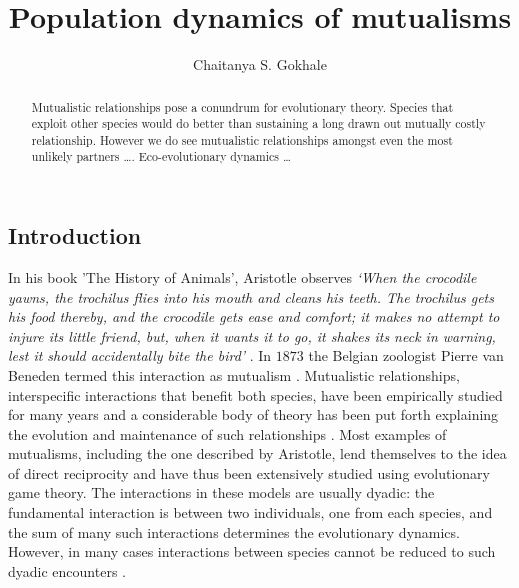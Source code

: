 \documentclass{pnastwo}
\begin{document}
\title{Population dynamics of mutualisms}

 \author{Chaitanya S. Gokhale}


\maketitle

\begin{article}

\begin{abstract}
Mutualistic relationships pose a conundrum for evolutionary theory.
Species that exploit other species would do better than sustaining a long drawn out mutually costly relationship. However we do see mutualistic relationships amongst even the most unlikely partners \ldots.
Eco-evolutionary dynamics \ldots
\end{abstract}



\section{Introduction}

In his book 'The History of Animals', Aristotle observes
{\em
`When the crocodile yawns, the trochilus flies into his mouth and cleans
his teeth. The trochilus gets his food thereby, and the crocodile
gets ease and comfort; it makes no attempt to injure its little friend,
but, when it wants it to go, it shakes its neck in warning, lest it
should accidentally bite the bird'} \cite{aristotle:350bc}.
In $1873$ the Belgian zoologist Pierre van Beneden termed this interaction as mutualism \cite{bronstein:book:2003}.
Mutualistic relationships, interspecific interactions that benefit both species, have been empirically studied for many years 
\cite{boucher:book:1985,hinton:PTENHS:1951,wilson:AmNat:1983,bronstein:QRB:1994,pierce:ARE:2002,kiers:Nature:2003,bshary:ASB:2004} and a considerable body of theory has been put forth explaining the evolution and maintenance of such relationships \cite{poulin:JTB:1995,doebeli:PNAS:1998,noe:book:2001,johnstone:ECL:2002,bergstrom:PNAS:2003,hoeksema:AmNat:2003,akcay:PRSB:2007,bshary:Nature:2008}.
Most examples of mutualisms, including the one described by Aristotle, lend themselves to the idea of direct reciprocity \cite{trivers:QRB:1971} and have thus been extensively studied using evolutionary game theory.
The interactions in these models are usually dyadic: the fundamental interaction is between two individuals, one from each species, and the sum of many such interactions determines the evolutionary dynamics. %
However, in many cases interactions between species cannot be reduced to such dyadic encounters \cite{stadler:book:2008}.


\end{article}
\end{document}
